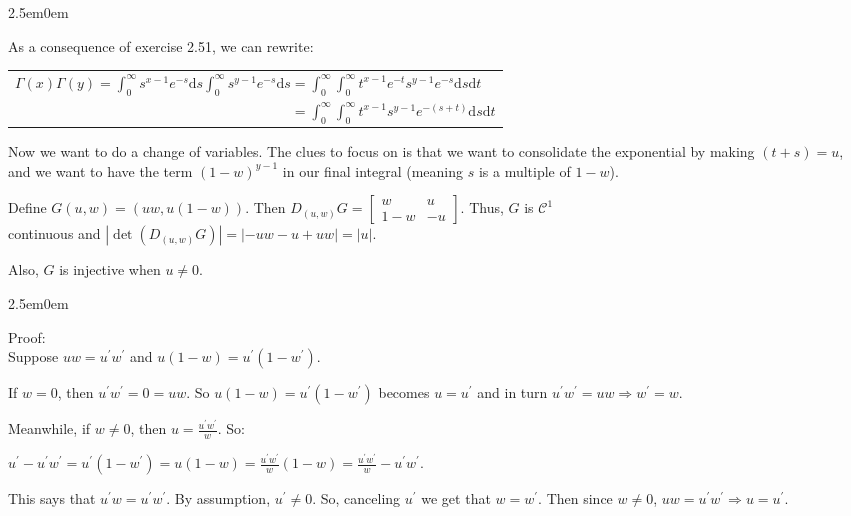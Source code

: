 \documentclass{book}
\newcommand{\exTwoP}{%
   \color{RedViolet}%
   \fontsize{13}{15}\selectfont%
}
\newcommand{\exPPP}{%
   \color{VioletRed}%
   \fontsize{12}{14}\selectfont%
}
\newenvironment{myIndent}{%
   \begin{adjustwidth}{2.5em}{0em}%
}{%
   \end{adjustwidth}%
}
\newcommand{\retTwo}{\hfill\bigbreak}
\begin{document}
\begin{myIndent}\exTwoP
	As a consequence of exercise 2.51, we can rewrite:
	
	{\center \begin{tabular}{l}
		$\Gamma(x)\Gamma(y) = \int_0^\infty s^{x-1}e^{-s}\mathrm{d}s \int_0^\infty s^{y-1}e^{-s}\mathrm{d}s = \int_0^\infty \int_0^\infty t^{x-1}e^{-t}s^{y-1}e^{-s}\mathrm{d}s\mathrm{d}t$\\ [6pt]

		$\phantom{\Gamma(x)\Gamma(y) = \int_0^\infty s^{x-1}e^{-s}\mathrm{d}s \int_0^\infty s^{y-1}e^{-s}\mathrm{d}s} = \int_0^\infty \int_0^\infty t^{x-1}s^{y-1}e^{-(s + t)}\mathrm{d}s\mathrm{d}t$
	\end{tabular}\retTwo\par}

	Now we want to do a change of variables. The clues to focus on is that we want to consolidate the exponential by making $(t + s) = u$, and we want to have the term $(1 - w)^{y-1}$ in our final integral (meaning $s$ is a multiple of $1 - w$).\retTwo

	Define $G(u, w) = (uw, u(1 - w))$. Then $D_{(u,w)}G = \left[
	\begin{smallmatrix}
		w & u \\ 1-w & -u
	\end{smallmatrix}\right]$. Thus, $G$ is $\mathcal{C}^1$\\ continuous and $|\det(D_{(u,w)}G)| = |{-}uw -u + uw| = |u|$.\retTwo

	Also, $G$ is injective when $u \neq 0$.
	\begin{myIndent}\exPPP
		Proof:\\
		Suppose $uw = u^\prime w^\prime$ and $u(1 - w) = u^\prime(1 - w^\prime)$.\newpage
		
		If $w = 0$, then $u^\prime w^\prime = 0 = uw$. So $u(1 - w) = u^\prime(1 - w^\prime)$ becomes $u = u^\prime$ and in turn $u^\prime w^\prime = uw \Longrightarrow w^\prime = w$.\retTwo

		Meanwhile, if $w \neq 0$, then $u = \frac{u^\prime w^\prime}{w}$. So:
		
		{\centering $u^\prime - u^\prime w^\prime = u^\prime(1 - w^\prime) = u(1 - w) = \frac{u^\prime w^\prime}{w}(1 - w) = \frac{u^\prime w^\prime}{w} - u^\prime w^\prime$.\retTwo\par}

		This says that $u^\prime w = u^\prime w^\prime$. By assumption, $u^\prime \neq 0$. So, canceling $u^\prime$ we get that $w = w^\prime$. Then since $w \neq 0$, $uw = u^\prime w^\prime \Longrightarrow u = u^\prime$.\retTwo
	\end{myIndent}


\end{myIndent}
\end{document}
